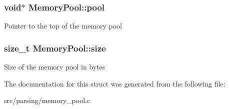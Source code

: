 \subsubsection[{\texorpdfstring{pool}{pool}}]{\setlength{\rightskip}{0pt plus 5cm}void$\ast$ Memory\+Pool\+::pool}\hypertarget{structMemoryPool_aac9222b12332558fb831f4b9b4400763}{}\label{structMemoryPool_aac9222b12332558fb831f4b9b4400763}
Pointer to the top of the memory pool 
\subsubsection[{\texorpdfstring{size}{size}}]{\setlength{\rightskip}{0pt plus 5cm}size\+\_\+t Memory\+Pool\+::size}\hypertarget{structMemoryPool_af554fe1d65607ebfd49e195db299b827}{}\label{structMemoryPool_af554fe1d65607ebfd49e195db299b827}
Size of the memory pool in bytes 

The documentation for this struct was generated from the following file\+:\begin{DoxyCompactItemize}
\item 
src/parsing/memory\+\_\+pool.\+c\end{DoxyCompactItemize}
